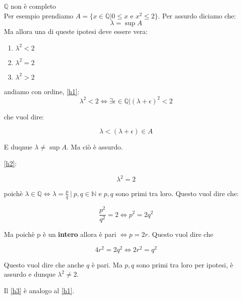 \documentclass{article}
\begin{document}
\begin{dimostrazione} \textbf{$\mathbb{Q}$} non è completo\\
	Per esempio prendiamo $A= \{x \in \mathbb{Q}| 0 \leq x $ e $x^2 \leq 2\}$.
	Per assurdo diciamo che:
	\begin{equation*}
		\lambda= \sup A
	\end{equation*}
Ma allora una di queste ipotesi deve essere vera:

\begin{enumerate}
	\item \label{h1}$ \lambda^2 < 2$
	\item \label{h2}$ \lambda^2 = 2$
	\item \label{h3}$ \lambda^2 > 2$
\end{enumerate}

andiamo con ordine, \autoref{h1}:
\begin{equation*}
	\lambda^2<2 \iff \exists \epsilon \in \mathbb{Q} | (\lambda + \epsilon)^2<2
\end{equation*}

che vuol dire:

\begin{equation*}
	\lambda<(\lambda + \epsilon) \in A
\end{equation*}

E duqnue $\lambda \neq \sup A$. Ma ciò è assurdo.


\autoref{h2}:

\begin{equation*}
	\lambda^2= 2
\end{equation*}

poichè $\lambda \in \mathbb{Q} \iff \lambda=\frac{p}{q} \ | \ p,q \in \mathbb{N}$ e $p,q$ sono primi tra loro. Questo vuol dire che:

\begin{equation*}
	\frac{p^2}{q^2}=2 \iff p^2=2q^2
\end{equation*}

Ma poichè p è un \textbf{intero} allora è pari $\iff p=2r$. Questo vuol dire che

\begin{equation*}
	4r^2=2q^2 \iff 2r^2=q^2
\end{equation*}

Questo vuol dire che anche $q$ è pari. Ma $p,q$ sono primi tra loro per ipotesi, è assurdo e dunque $\lambda^2 \neq 2$.

Il \autoref{h3} è analogo al \autoref{h1}.

\end{dimostrazione}
\end{document}
